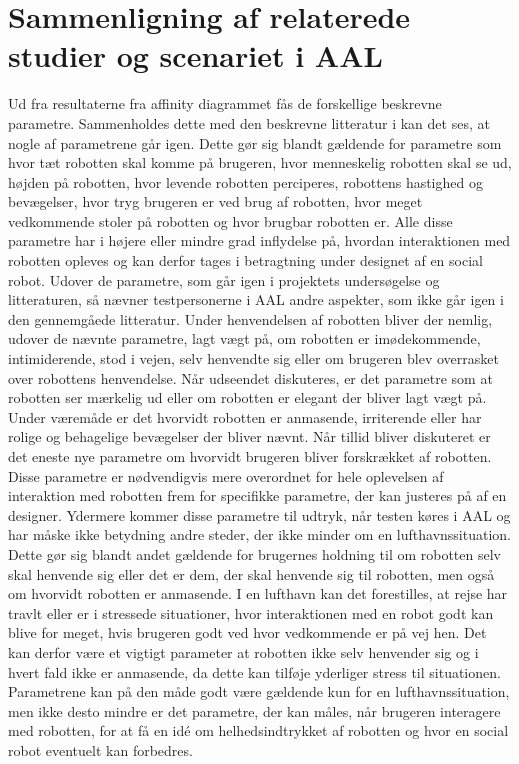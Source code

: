 \section{Sammenligning af relaterede studier og scenariet i AAL}
\label{ParametreTidligereStudier}
%
Ud fra resultaterne fra affinity diagrammet fås de forskellige beskrevne parametre. Sammenholdes dette med den beskrevne litteratur i  kan det ses, at nogle af parametrene går igen. Dette gør sig blandt gældende for parametre som hvor tæt robotten skal komme på brugeren, hvor menneskelig robotten skal se ud, højden på robotten, hvor levende robotten perciperes, robottens hastighed og bevægelser, hvor tryg brugeren er ved brug af robotten, hvor meget vedkommende stoler på robotten og hvor brugbar robotten er. Alle disse parametre har i højere eller mindre grad inflydelse på, hvordan interaktionen med robotten opleves og kan derfor tages i betragtning under designet af en social robot. \blankline
%
Udover de parametre, som går igen i projektets undersøgelse og litteraturen, så nævner testpersonerne i AAL andre aspekter, som ikke går igen i den gennemgåede litteratur. Under henvendelsen af robotten bliver der nemlig, udover de nævnte parametre, lagt vægt på, om robotten er imødekommende, intimiderende, stod i vejen, selv henvendte sig eller om brugeren blev overrasket over robottens henvendelse. Når udseendet diskuteres, er det parametre som at robotten ser mærkelig ud eller om robotten er elegant der bliver lagt vægt på. Under væremåde er det hvorvidt robotten er anmasende, irriterende eller har rolige og behagelige bevægelser der bliver nævnt. Når tillid bliver diskuteret er det eneste nye parametre om hvorvidt brugeren bliver forskrækket af robotten. Disse parametre er nødvendigvis mere overordnet for hele oplevelsen af interaktion med robotten frem for specifikke parametre, der kan justeres på af en designer. Ydermere kommer disse parametre til udtryk, når testen køres i AAL og har måske ikke betydning andre steder, der ikke minder om en lufthavnssituation. Dette gør sig blandt andet gældende for brugernes holdning til om robotten selv skal henvende sig eller det er dem, der skal henvende sig til robotten, men også om hvorvidt robotten er anmasende. I en lufthavn kan det forestilles, at rejse har travlt eller er i stressede situationer, hvor interaktionen med en robot godt kan blive for meget, hvis brugeren godt ved hvor vedkommende er på vej hen. Det kan derfor være et vigtigt parameter at robotten ikke selv henvender sig og i hvert fald ikke er anmasende, da dette kan tilføje yderliger stress til situationen. Parametrene kan på den måde godt være gældende kun for en lufthavnssituation, men ikke desto mindre er det parametre, der kan måles, når brugeren interagere med robotten, for at få en idé om helhedsindtrykket af robotten og hvor en social robot eventuelt kan forbedres. \blankline
